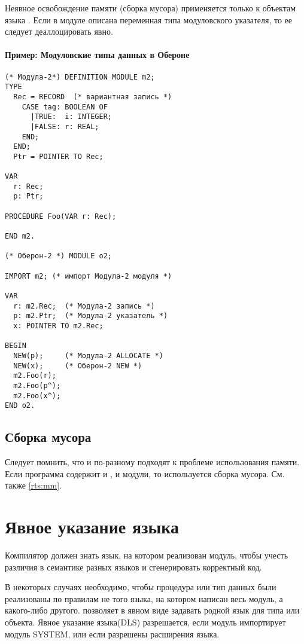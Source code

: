 Неявное освобождение памяти (сборка мусора) применяется только к 
объектам языка \ot{}. Если в
\ot{} модуле описана переменная типа модуловского указателя, 
то ее следует деаллоцировать явно. 

\paragraph{Пример: Модуловские типы данных в Обероне}
\begin{verbatim}
(* Модула-2*) DEFINITION MODULE m2;
TYPE
  Rec = RECORD  (* вариантная запись *)
    CASE tag: BOOLEAN OF
      |TRUE:  i: INTEGER;
      |FALSE: r: REAL;
    END;
  END;
  Ptr = POINTER TO Rec;

VAR
  r: Rec;
  p: Ptr;

PROCEDURE Foo(VAR r: Rec);

END m2.

(* Оберон-2 *) MODULE o2;

IMPORT m2; (* импорт Модула-2 модуля *)

VAR
  r: m2.Rec;  (* Модула-2 запись *)
  p: m2.Ptr;  (* Модула-2 указатель *)
  x: POINTER TO m2.Rec;

BEGIN
  NEW(p);     (* Модула-2 ALLOCATE *)
  NEW(x);     (* Оберон-2 NEW *)
  m2.Foo(r);
  m2.Foo(p^);
  m2.Foo(x^);
END o2.
\end{verbatim}

\subsection{Сборка мусора}

Следует помнить, что \mt{} и \ot{} по-разному подходят к проблеме
использования памяти. Если программа содержит и
\mt{}, и \ot{} модули, то используется сборка мусора.
См. также \ref{rts:mm}.


\section{Явное указание языка}\label{multilang:direct}

Компилятор должен знать язык, на котором реализован модуль,
чтобы учесть различия в семантике разных языков и сгенерировать
корректный код.

В некоторых случаях необходимо, чтобы процедура или тип данных были
реализованы по правилам не того языка, на котором написан весь модуль,
а какого-либо другого.
\xds{} позволяет в явном виде задавать родной язык для типа или объекта.
Явное указание языка(DLS) разрешается, если модуль импортирует
модуль SYSTEM, или если разрешены расширения языка.

